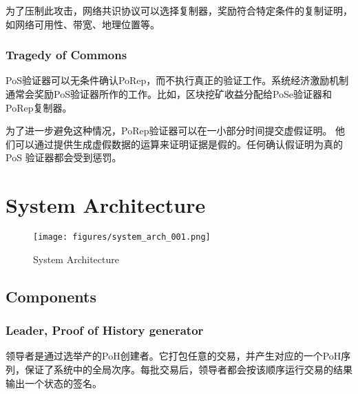 \documentclass[12pt, uft8]{ctexart}
\begin{document}
为了压制此攻击，网络共识协议可以选择复制器，奖励符合特定条件的复制证明，如网络可用性、带宽、地理位置等。

\subsubsection{Tragedy of Commons}

PoS验证器可以无条件确认PoRep，而不执行真正的验证工作。系统经济激励机制通常会奖励PoS验证器所作的工作。比如，区块挖矿收益分配给PoSe验证器和PoRep复制器。

为了进一步避免这种情况，PoRep验证器可以在一小部分时间提交虚假证明。  他们可以通过提供生成虚假数据的运算来证明证据是假的。任何确认假证明为真的PoS 验证器都会受到惩罚。

\section{System Architecture}\label{system_architecture}

\begin{figure}
  \begin{center}
    \centering
    \texttt{[image: figures/system\_arch\_001.png]}
    \caption[Fig 9]{System Architecture \label{fig_9}}
  \end{center}
  \end{figure}

\subsection{Components}

\subsubsection{Leader, Proof of History generator}
领导者是通过选举产的PoH创建者。它打包任意的交易，并产生对应的一个PoH序列，保证了系统中的全局次序。每批交易后，领导者都会按该顺序运行交易的结果输出一个状态的签名。
\end{document}
